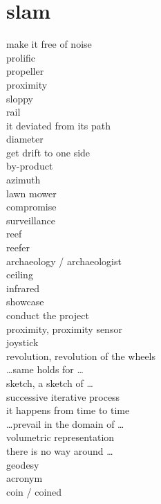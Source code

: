 \documentclass[12pt]{article}
\begin{document}
\section{slam}
make it free of noise \\
prolific \\
propeller \\
proximity \\
sloppy \\
rail \\
it deviated from its path \\
diameter \\
get drift to one side \\
by-product \\
azimuth \\
lawn mower \\
compromise \\
surveillance \\
reef \\
reefer \\
archaeology / archaeologist \\
ceiling \\
infrared \\
showcase \\
conduct the project \\
proximity, proximity sensor \\
joystick \\
revolution, revolution of the wheels \\
\dots same holds for \dots \\
sketch, a sketch of \dots \\
successive iterative process \\
it happens from time to time \\
\dots prevail in the domain of \dots \\
volumetric representation \\
there is no way around \dots \\
geodesy \\
acronym \\
coin / coined \\
\end{document}

